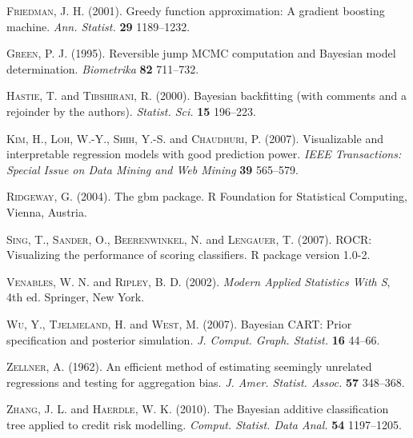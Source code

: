 \documentclass[aoas,nameyear,dvips]{arximspdf}
\begin{document}
\begin{thebibliography}{99}
\textsc{Friedman}, J. H.  (2001). Greedy function
  approximation: A gradient boosting machine. \textit{Ann. Statist.}
  \textbf{29} 1189--1232.

\textsc{Green}, P. J.  (1995). Reversible jump {MCMC}
  computation and {B}ayesian model determination. \textit{Biometrika} \textbf{82} 711--732.

\textsc{Hastie}, T. and \textsc{Tibshirani}, R.  (2000).
Bayesian backfitting (with comments and a rejoinder by the authors).
\textit{Statist. Sci.} \textbf{15} 196--223.

\textsc{Kim}, H., \textsc{Loh}, W.-Y., \textsc{Shih}, Y.-S. and \textsc{Chaudhuri}, P.  (2007). Visualizable and interpretable regression models with
  good prediction power. \textit{IEEE Transactions: Special Issue on Data Mining
  and Web Mining} \textbf{39} 565--579.


\textsc{Ridgeway}, G.  (2004). The gbm package. R
  Foundation for Statistical Computing, Vienna, Austria.

\textsc{Sing}, T., \textsc{Sander}, O., \textsc{Beerenwinkel}, N. and \textsc{Lengauer}, T.  (2007).
ROCR: Visualizing the performance of scoring  classifiers.
R package version 1.0-2.

\textsc{Venables}, W. N. and \textsc{Ripley}, B. D.  (2002).
\textit{Modern Applied  Statistics With {S}}, 4th ed. Springer, New York.

\textsc{Wu}, Y., \textsc{Tjelmeland}, H. and \textsc{West}, M.  (2007).
Bayesian {CART}: Prior specification and posterior simulation.
\textit{J. Comput. Graph. Statist.} \textbf{16} 44--66.

\textsc{Zellner}, A.  (1962). An efficient method of
  estimating seemingly unrelated regressions and testing for aggregation
  bias. \textit{J. Amer. Statist. Assoc.} \textbf{57} 348--368.

\textsc{Zhang}, J. L. and \textsc{Haerdle}, W. K.  (2010). The
  {B}ayesian additive classification tree applied to credit risk
  modelling. \textit{Comput. Statist. Data Anal.} \textbf{54}
  1197--1205.


\end{thebibliography}
\end{document}
